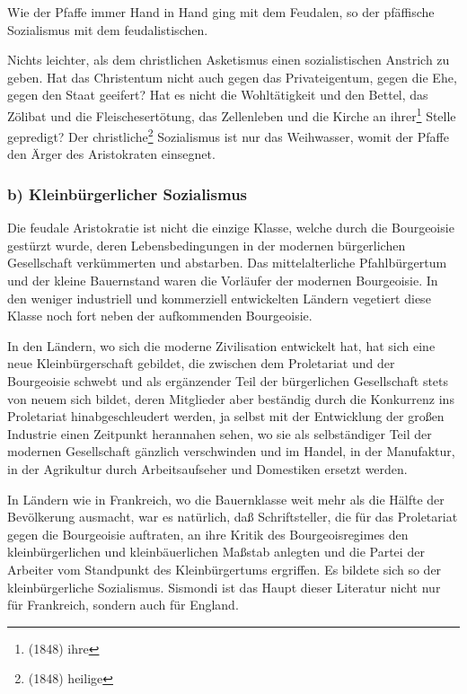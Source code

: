 \documentclass[letterpaper]{article}
\begin{document}
Wie der Pfaffe immer Hand in Hand ging mit dem Feudalen, so der pfäffische Sozialismus mit dem feudalistischen.

Nichts leichter, als dem christlichen Asketismus einen sozialistischen Anstrich zu geben. Hat das Christentum nicht auch gegen das Privateigentum, gegen die Ehe, gegen den Staat geeifert? Hat es nicht die Wohltätigkeit und den Bettel, das Zölibat und die Fleischesertötung, das Zellenleben und die Kirche an ihrer\footnote{(1848) ihre} Stelle gepredigt? Der christliche\footnote{(1848) heilige} Sozialismus ist nur das Weihwasser, womit der Pfaffe den Ärger des Aristokraten einsegnet.

\subsubsection{b) Kleinbürgerlicher Sozialismus}

Die feudale Aristokratie ist nicht die einzige Klasse, welche durch die Bourgeoisie gestürzt wurde, deren Lebensbedingungen in der modernen bürgerlichen Gesellschaft verkümmerten und abstarben. Das mittelalterliche Pfahlbürgertum und der kleine Bauernstand waren die Vorläufer der modernen Bourgeoisie. In den weniger industriell und kommerziell entwickelten Ländern vegetiert diese Klasse noch fort neben der aufkommenden Bourgeoisie.

In den Ländern, wo sich die moderne Zivilisation entwickelt hat, hat sich eine neue Kleinbürgerschaft gebildet, die zwischen dem Proletariat und der Bourgeoisie schwebt und als ergänzender Teil der bürgerlichen Gesellschaft stets von neuem sich bildet, deren Mitglieder aber beständig durch die Konkurrenz ins Proletariat hinabgeschleudert werden, ja selbst mit der Entwicklung der großen Industrie einen Zeitpunkt herannahen sehen, wo sie als selbständiger Teil der modernen Gesellschaft gänzlich verschwinden und im Handel, in der Manufaktur, in der Agrikultur durch Arbeitsaufseher und Domestiken ersetzt werden.

In Ländern wie in Frankreich, wo die Bauernklasse weit mehr als die Hälfte der Bevölkerung ausmacht, war es natürlich, daß Schriftsteller, die für das Proletariat gegen die Bourgeoisie auftraten, an ihre Kritik des Bourgeoisregimes den kleinbürgerlichen und kleinbäuerlichen Maßstab anlegten und die Partei der Arbeiter vom Standpunkt des Kleinbürgertums ergriffen. Es bildete sich so der kleinbürgerliche Sozialismus. Sismondi ist das Haupt dieser Literatur nicht nur für Frankreich, sondern auch für England.
\end{document}
